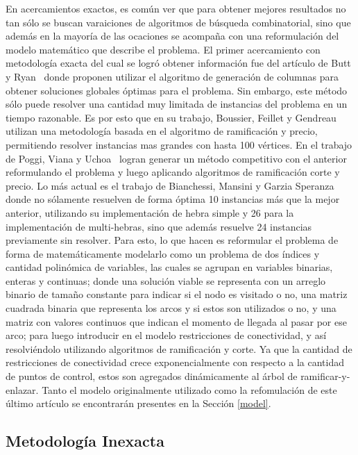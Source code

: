 En acercamientos exactos, es com\'un ver que para obtener mejores resultados no tan s\'olo se buscan varaiciones de algoritmos de b\'usqueda combinatorial, sino que adem\'as en la mayor\'ia de las ocaciones se acompa\~na con una reformulaci\'on del modelo matem\'atico que describe el problema. El primer acercamiento con metodolog\'ia exacta del cual se logr\'o obtener informaci\'on fue del art\'iculo de Butt y Ryan~\cite{BUTT1999427} donde proponen utilizar el algoritmo de generaci\'on de columnas para obtener soluciones globales \'optimas para el problema. Sin embargo, este m\'etodo s\'olo puede resolver una cantidad muy limitada de instancias del problema en un tiempo razonable. Es por esto que en su trabajo, Boussier, Feillet y Gendreau~\cite{exactAlgorithm} utilizan una metodolog\'ia basada en el algoritmo de ramificaci\'on y precio, permitiendo resolver instancias mas grandes con hasta 100 v\'ertices. En el trabajo de Poggi, Viana y Uchoa~\cite{poggi_et_al:OASIcs:2010:2756} logran generar un m\'etodo competitivo con el anterior reformulando el problema y luego aplicando algoritmos de ramificaci\'on corte y precio. Lo m\'as actual es el trabajo de Bianchessi, Mansini y Garzia Speranza~\cite{doi:10.1111/itor.12422} donde no s\'olamente resuelven de forma \'optima 10 instancias m\'as que la mejor anterior, utilizando su implementaci\'on de hebra simple y 26 para la implementaci\'on de multi-hebras, sino que adem\'as resuelve 24 instancias previamente sin resolver. Para esto, lo que hacen es reformular el problema de forma de matem\'aticamente modelarlo como un problema de dos \'indices y cantidad polin\'omica de variables, las cuales se agrupan en variables binarias, enteras y continuas; donde una soluci\'on viable se representa con un arreglo binario de tama\~no constante para indicar si el nodo es visitado o no, una matriz cuadrada binaria que representa los arcos y si estos son utilizados o no, y una matriz con valores continuos que indican el momento de llegada al pasar por ese arco; para luego introducir en el modelo restricciones de conectividad, y as\'i resolvi\'endolo utilizando algoritmos de ramificaci\'on y corte. Ya que la cantidad de restricciones de conectividad crece exponencialmente con respecto a la cantidad de puntos de control, estos son agregados din\'amicamente al \'arbol de ramificar-y-enlazar. Tanto el modelo originalmente utilizado como la refomulaci\'on de este \'ultimo art\'iculo se encontrar\'an presentes en la Secci\'on \ref{model}.

\subsection{Metodolog\'ia Inexacta}

